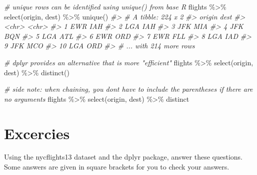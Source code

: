 \documentclass[
]{book}
\newenvironment{Shaded}{\begin{snugshade}}{\end{snugshade}}
\newcommand{\CommentTok}[1]{\textcolor[rgb]{0.56,0.35,0.01}{\textit{#1}}}
\newcommand{\FunctionTok}[1]{\textcolor[rgb]{0.00,0.00,0.00}{#1}}
\newcommand{\NormalTok}[1]{#1}
\newcommand{\SpecialCharTok}[1]{\textcolor[rgb]{0.00,0.00,0.00}{#1}}
\begin{document}
\begin{Shaded}
\begin{Highlighting}[]
\CommentTok{\# unique rows can be identified using unique() from base R}
\NormalTok{flights }\SpecialCharTok{\%\textgreater{}\%} \FunctionTok{select}\NormalTok{(origin, dest) }\SpecialCharTok{\%\textgreater{}\%} \FunctionTok{unique}\NormalTok{()}
\CommentTok{\#\textgreater{} \# A tibble: 224 x 2}
\CommentTok{\#\textgreater{}    origin dest }
\CommentTok{\#\textgreater{}    \textless{}chr\textgreater{}  \textless{}chr\textgreater{}}
\CommentTok{\#\textgreater{}  1 EWR    IAH  }
\CommentTok{\#\textgreater{}  2 LGA    IAH  }
\CommentTok{\#\textgreater{}  3 JFK    MIA  }
\CommentTok{\#\textgreater{}  4 JFK    BQN  }
\CommentTok{\#\textgreater{}  5 LGA    ATL  }
\CommentTok{\#\textgreater{}  6 EWR    ORD  }
\CommentTok{\#\textgreater{}  7 EWR    FLL  }
\CommentTok{\#\textgreater{}  8 LGA    IAD  }
\CommentTok{\#\textgreater{}  9 JFK    MCO  }
\CommentTok{\#\textgreater{} 10 LGA    ORD  }
\CommentTok{\#\textgreater{} \# ... with 214 more rows}
\end{Highlighting}
\end{Shaded}

\begin{Shaded}
\begin{Highlighting}[]
\CommentTok{\# dplyr provides an alternative that is more "efficient"}
\NormalTok{flights }\SpecialCharTok{\%\textgreater{}\%} \FunctionTok{select}\NormalTok{(origin, dest) }\SpecialCharTok{\%\textgreater{}\%} \FunctionTok{distinct}\NormalTok{()}

\CommentTok{\# side note: when chaining, you don\textquotesingle{}t have to include the parentheses if there are no arguments}
\NormalTok{flights }\SpecialCharTok{\%\textgreater{}\%} \FunctionTok{select}\NormalTok{(origin, dest) }\SpecialCharTok{\%\textgreater{}\%}\NormalTok{ distinct}
\end{Highlighting}
\end{Shaded}

\hypertarget{excercies}{%
\section{Excercies}\label{excercies}}

Using the nycflights13 dataset and the dplyr package, answer these questions. Some answers are given in square brackets for you to check your answers.
\end{document}
